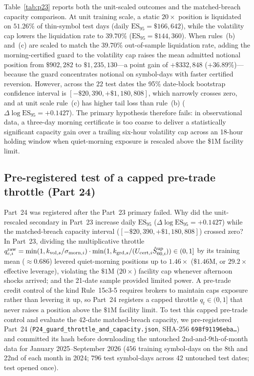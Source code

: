 \documentclass[12pt]{article}
\theoremstyle{definition}
\theoremstyle{remark}
\begin{document}
Table~\ref{tab:p23} reports both the unit-scaled outcomes and the matched-breach capacity comparison. At unit training scale, a static $20\times$ position is liquidated on $51.26\%$ of thin-symbol test days (daily $\mathrm{ES}_{95}=\$166{,}642$), while the volatility cap lowers the liquidation rate to $39.70\%$ ($\mathrm{ES}_{95}=\$144{,}360$). When rules~(b) and~(c) are scaled to match the $39.70\%$ out-of-sample liquidation rate, adding the morning-certified guard to the volatility cap raises the mean admitted notional position from $\$902{,}282$ to $\$1{,}235{,}130$---a point gain of $+\$332{,}848$ ($+36.89\%$)---because the guard concentrates notional on symbol-days with faster certified reversion. However, across the $22$ test dates the 95\% date-block bootstrap confidence interval is $[-\$20{,}390,+\$1{,}180{,}808]$, which narrowly crosses zero, and at unit scale rule~(c) has higher tail loss than rule~(b) ($\Delta\log\mathrm{ES}_{95}=+0.1427$). The primary hypothesis therefore fails: in observational data, a three-day morning certificate is too coarse to deliver a statistically significant capacity gain over a trailing six-hour volatility cap across an 18-hour holding window when quiet-morning exposure is rescaled above the \$1M facility limit.

\subsection{Pre-registered test of a capped pre-trade throttle (Part 24)}\label{sec:p24}
Part~24 was registered after the Part~23 primary failed. Why did the unit-rescaled secondary in Part~23 increase daily $\mathrm{ES}_{95}$ ($\Delta\log\mathrm{ES}_{95}=+0.1427$) while the matched-breach capacity interval ($[-\$20{,}390,+\$1{,}180{,}808]$) crossed zero? In Part~23, dividing the multiplicative throttle $q^{\rm raw}_{c,i}=\min(1,k_{{\rm vol},s}/\sigma_{{\rm morn},i})\cdot\min(1,k_{{\rm grd},s}/(U_{{\rm cert},i}\hat S^{\rm up}_{60,i}))\in(0,1]$ by its training mean ($\approx0.686$) levered quiet-morning positions up to $1.46\times$ ($\$1.46\text{M}$, or $29.2\times$ effective leverage), violating the $\$1\text{M}$ ($20\times$) facility cap whenever afternoon shocks arrived; and the 21-date sample provided limited power. A pre-trade credit control of the kind Rule~15c3-5 requires brokers to maintain caps exposure rather than levering it up, so Part~24 registers a capped throttle $q_t\in(0,1]$ that never raises a position above the $\$1\text{M}$ facility limit. To test this capped pre-trade control and evaluate the 42-date matched-breach capacity, we pre-registered Part~24 (\texttt{P24\_guard\_throttle\_and\_capacity.json}, SHA-256 \texttt{698f91196eba\ldots}) and committed its hash before downloading the untouched 2nd-and-9th-of-month data for January 2025--September 2026 ($456$ training symbol-days on the 8th and 22nd of each month in 2024; $796$ test symbol-days across 42 untouched test dates; test opened once).
\end{document}
